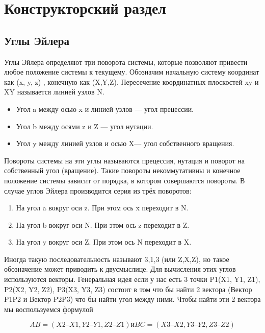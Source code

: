 \chapter{Конструкторский раздел}


\section{Углы Эйлера}
\hspace{0.6cm} Углы Эйлера определяют три поворота системы, которые позволяют привести любое положение системы к текущему. Обозначим начальную систему координат как (x, y, z) , конечную как (X,Y,Z). Пересечение координатных плоскостей xy и XY называется линией узлов N.
\begin{itemize}
	\item Угол a между осью x и линией узлов — угол прецессии.
	\item Угол b между осями z и Z — угол нутации.
	\item Угол y между линией узлов и осью  X— угол собственного вращения.
\end{itemize}

\hspace{0.6cm} Повороты системы на эти углы называются прецессия, нутация и поворот на собственный угол (вращение). Такие повороты некоммутативны и конечное положение системы зависит от порядка, в котором совершаются повороты. В случае углов Эйлера производится серия из трёх поворотов:
\begin{enumerate}
	\item На угол a вокруг оси z. При этом ось x переходит в N.
	\item На угол b вокруг оси N. При этом ось z переходит в Z.
	\item На угол y вокруг оси Z. При этом ось N переходит в X.
\end{enumerate}

\hspace{0.6cm} Иногда такую последовательность называют 3,1,3 (или Z,X,Z), но такое обозначение может приводить к двусмыслице.
\hspace{0.6cm} Для вычисления этих углов используются векторы. Генеральная идея если у нас есть 3 точки P1(X1, Y1, Z1),  P2(X2, Y2, Z2),  P3(X3, Y3, Z3) состоит в том что бы найти 2 вектора (Вектор P1P2 и Вектор P2P3) что бы найти угол между ними. Чтобы найти эти 2 вектора мы воспользуемся формулой

\begin{equation} 
\displaystyle AB = (X2 – X1, Y2 – Y1, Z2 – Z1) и BC = (X3 – X2, Y3 – Y2, Z3 – Z2) 
\end{equation}

